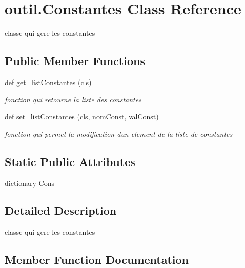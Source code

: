\hypertarget{classoutil_1_1_constantes}{}\section{outil.\+Constantes Class Reference}
\label{classoutil_1_1_constantes}


classe qui gere les constantes  


\subsection*{Public Member Functions}
\begin{DoxyCompactItemize}
\item 
def \hyperlink{classoutil_1_1_constantes_a186909cc903958f769aa531eb94dd264}{get\+\_\+list\+Constantes} (cls)
\begin{DoxyCompactList}\small\item\em fonction qui retourne la liste des constantes \end{DoxyCompactList}\item 
def \hyperlink{classoutil_1_1_constantes_af35fe7ebb9df8350160593eeb2436849}{set\+\_\+list\+Constantes} (cls, nom\+Const, val\+Const)
\begin{DoxyCompactList}\small\item\em fonction qui permet la modification d\textquotesingle{}un element de la liste de constantes \end{DoxyCompactList}\end{DoxyCompactItemize}
\subsection*{Static Public Attributes}
\begin{DoxyCompactItemize}
\item 
dictionary \hyperlink{classoutil_1_1_constantes_acff4386578b87455388730ad468cbe64}{Cons}
\end{DoxyCompactItemize}


\subsection{Detailed Description}
classe qui gere les constantes 

\subsection{Member Function Documentation}
\mbox{\label{classoutil_1_1_constantes_a186909cc903958f769aa531eb94dd264}} 
